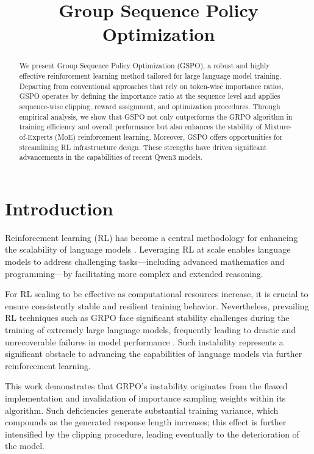 \title{Group Sequence Policy Optimization}

\begin{abstract}
We present Group Sequence Policy Optimization (GSPO), a robust and highly effective reinforcement learning method tailored for large language model training. Departing from conventional approaches that rely on token-wise importance ratios, GSPO operates by defining the importance ratio at the sequence level and applies sequence-wise clipping, reward assignment, and optimization procedures. Through empirical analysis, we show that GSPO not only outperforms the GRPO algorithm in training efficiency and overall performance but also enhances the stability of Mixture-of-Experts (MoE) reinforcement learning. Moreover, GSPO offers opportunities for streamlining RL infrastructure design. These strengths have driven significant advancements in the capabilities of recent Qwen3 models.
\end{abstract}

\section{Introduction}
\label{sec:intro}

Reinforcement learning (RL) has become a central methodology for enhancing the scalability of language models \citep{o1,dpsk-r1,qwq32b,qwen3}. Leveraging RL at scale enables language models to address challenging tasks—including advanced mathematics and programming—by facilitating more complex and extended reasoning.

For RL scaling to be effective as computational resources increase, it is crucial to ensure consistently stable and resilient training behavior. Nevertheless, prevailing RL techniques such as GRPO \citep{grpo} face significant stability challenges during the training of extremely large language models, frequently leading to drastic and unrecoverable failures in model performance \citep{qwen3, minimax-m1}. Such instability represents a significant obstacle to advancing the capabilities of language models via further reinforcement learning.

This work demonstrates that GRPO's instability originates from the flawed implementation and invalidation of importance sampling weights within its algorithm. Such deficiencies generate substantial training variance, which compounds as the generated response length increases; this effect is further intensified by the clipping procedure, leading eventually to the deterioration of the model.

